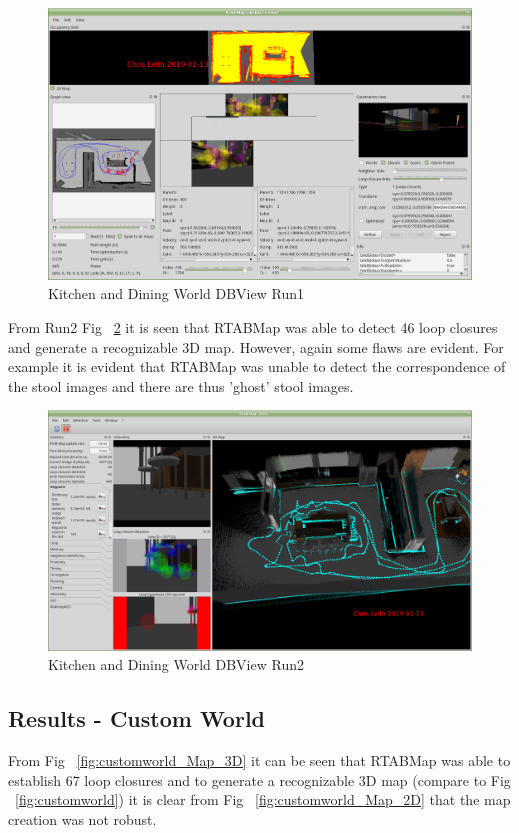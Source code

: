\documentclass[10pt,journal,compsoc]{IEEEtran}
\begin{document}
\begin{figure}[h]
      \centering
      \includegraphics[width=\linewidth]{Assets/DBViewer_kitchen_2019-02-11_19-04-25.png}
      \caption{Kitchen and Dining World DBView Run1}
      \label{fig:kitchen_dbview_run1}
\end{figure}

From Run2 Fig ~\ref{fig:kitchen_dbview_run2} it is seen that RTABMap was able to detect 46 loop closures and generate a recognizable 3D map. However, again some flaws are evident. For example it is evident that RTABMap was unable to detect the correspondence of the stool images and there are thus 'ghost' stool images.

\begin{figure}[h]
      \centering
      \includegraphics[width=\linewidth]{Assets/rtabviz_kitchen46LC_2019-02-11_19-04-25.png}
      \caption{Kitchen and Dining World DBView Run2}
      \label{fig:kitchen_dbview_run2}
\end{figure}

\subsection{Results - Custom World}
From Fig ~\ref{fig:customworld_Map_3D} it can be seen that RTABMap was able to establish 67 loop closures and to generate a recognizable 3D map (compare to Fig ~\ref{fig:customworld}) it is clear from Fig ~\ref{fig:customworld_Map_2D} that the map creation was not robust.
\end{document}
